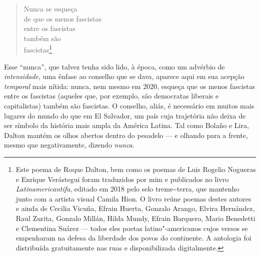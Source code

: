\begin{verse}
Nunca se esqueça\\
de que os menos fascistas\\
entre os fascistas\\
também são\\
fascistas\footnote{Este poema de Roque Dalton, bem como os poemas de
  Luis Rogelio Nogueras e Enrique Verástegui foram traduzidos por mim e
  publicados no livro \emph{Latinamericantifa}, editado em 2018 pelo
  selo treme\textasciitilde{}terra, que mantenho junto com a artista
  visual Camila Hion. O livro reúne poemas destes autores e ainda de
  Cecilia Vicuña, Efrain Huerta, Gonzalo Arango, Elvira Hernández, Raul
  Zurita, Gonzalo Millán, Hilda Mundy, Efrain Barquero, Mario Benedetti
  e Clementina Suárez --- todos eles poetas latino"-americanos cujos versos
  se empenharam na defesa da liberdade dos povos do continente. A
  antologia foi distribuída gratuitamente nas ruas e disponibilizada
  digitalmente.}
\end{verse}

Esse ``nunca'', que talvez tenha sido lido, à época, como um advérbio de
\emph{intensidade}, uma ênfase ao conselho que se dava, aparece aqui em
sua acepção \emph{temporal} mais nítida: nunca, nem mesmo em 2020,
esqueça que os menos fascistas entre os fascistas (aqueles que, por
exemplo, são democratas liberais e capitalistas) também são fascistas. O
conselho, aliás, é necessário em muitos mais lugares do mundo do que em
El Salvador, um país cuja trajetória não deixa de ser símbolo da
história mais ampla da América Latina. Tal como Bolaño e Lira, Dalton
mantém os olhos abertos dentro do pesadelo --- e olhando para a frente, mesmo
que negativamente, dizendo \emph{nunca}.

\asterisc

